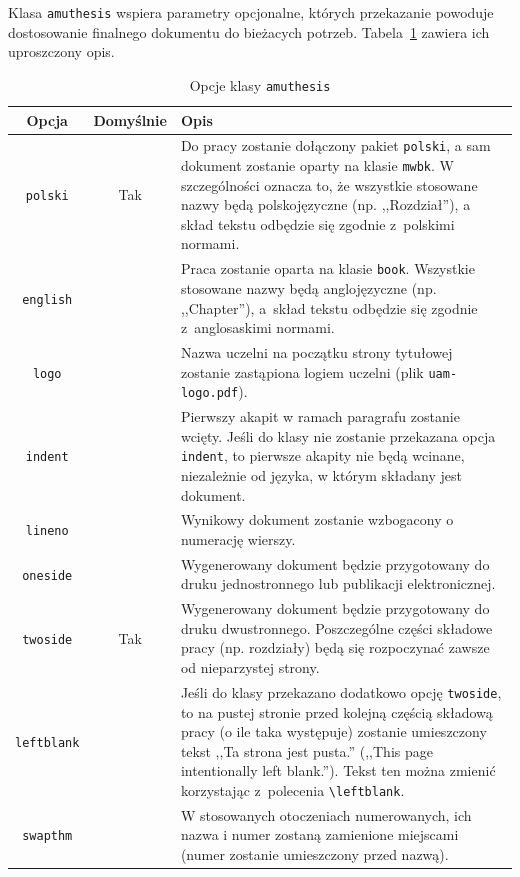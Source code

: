 \documentclass[oneside]{amuthesis}
\begin{document}
Klasa \texttt{amuthesis} wspiera parametry opcjonalne, których przekazanie powoduje dostosowanie finalnego dokumentu do bieżacych potrzeb. Tabela~\ref{table:amuthesis-opcje} zawiera ich uproszczony opis.

\begin{table}[p]
  \caption{Opcje klasy \texttt{amuthesis}}
  \label{table:amuthesis-opcje}
  \centering
  \begin{tabular}{ccp{9cm}}
    \toprule
    Opcja & Domyślnie & Opis\\
    \midrule
    \texttt{polski} & Tak & Do pracy zostanie dołączony pakiet \texttt{polski}, a sam dokument zostanie oparty na klasie \texttt{mwbk}. W szczególności oznacza to, że wszystkie stosowane nazwy będą polskojęzyczne (np. ,,Rozdział''), a skład tekstu odbędzie się zgodnie z~polskimi normami.\\
    \midrule
    \texttt{english} & & Praca zostanie oparta na klasie \texttt{book}. Wszystkie stosowane nazwy będą anglojęzyczne (np. ,,Chapter''), a~skład tekstu odbędzie się zgodnie z~anglosaskimi normami.\\
    \midrule
    \texttt{logo} & & Nazwa uczelni na początku strony tytułowej zostanie zastąpiona logiem uczelni (plik \texttt{uam-logo.pdf}).\\
    \midrule
    \texttt{indent} & & Pierwszy akapit w ramach paragrafu zostanie wcięty. Jeśli do klasy nie zostanie przekazana opcja \texttt{indent}, to pierwsze akapity nie będą wcinane, niezależnie od języka, w którym składany jest dokument.\\
    \midrule
    \texttt{lineno} & & Wynikowy dokument zostanie wzbogacony o numerację wierszy.\\
    \midrule
    \texttt{oneside} & & Wygenerowany dokument będzie przygotowany do druku jednostronnego lub publikacji elektronicznej.\\
    \midrule
    \texttt{twoside} & Tak & Wygenerowany dokument będzie przygotowany do druku dwustronnego. Poszczególne części składowe pracy (np. rozdziały) będą się rozpoczynać zawsze od nieparzystej strony.\\
    \midrule
    \texttt{leftblank} & & Jeśli do klasy przekazano dodatkowo opcję \texttt{twoside}, to na pustej stronie przed kolejną częścią składową pracy (o ile taka występuje) zostanie umieszczony tekst ,,Ta strona jest pusta.'' (,,This page intentionally left blank.''). Tekst ten można zmienić korzystając z~polecenia \verb`\leftblank`.\\
    \midrule
    \texttt{swapthm} & & W stosowanych otoczeniach numerowanych, ich nazwa i numer zostaną zamienione miejscami (numer zostanie umieszczony przed nazwą).\\
    \bottomrule
  \end{tabular}
\end{table}
\end{document}

